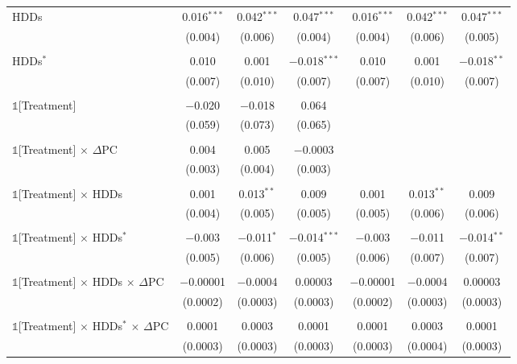 \begin{ThreePartTable}
\begin{longtable}{@{\extracolsep{0pt}}lcccccc}
            HDDs & 0.016$^{***}$ & 0.042$^{***}$ & 0.047$^{***}$ & 0.016$^{***}$ & 0.042$^{***}$ & 0.047$^{***}$ \\ 
            & (0.004) & (0.006) & (0.004) & (0.004) & (0.006) & (0.005) \\ 
            & & & & & & \\ 
            HDDs$^{*}$ & 0.010 & 0.001 & $-$0.018$^{***}$ & 0.010 & 0.001 & $-$0.018$^{**}$ \\ 
            & (0.007) & (0.010) & (0.007) & (0.007) & (0.010) & (0.007) \\ 
            & & & & & & \\ 
            $\mathbb{1}$[Treatment] & $-$0.020 & $-$0.018 & 0.064 &  &  &  \\ 
            & (0.059) & (0.073) & (0.065) &  &  &  \\ 
            & & & & & & \\ 
            $\mathbb{1}$[Treatment] $\times$ $\Delta$PC & 0.004 & 0.005 & $-$0.0003 &  &  &  \\ 
            & (0.003) & (0.004) & (0.003) &  &  &  \\ 
            & & & & & & \\ 
            $\mathbb{1}$[Treatment] $\times$ HDDs & 0.001 & 0.013$^{**}$ & 0.009 & 0.001 & 0.013$^{**}$ & 0.009 \\ 
            & (0.004) & (0.005) & (0.005) & (0.005) & (0.006) & (0.006) \\ 
            & & & & & & \\ 
            $\mathbb{1}$[Treatment] $\times$ HDDs$^{*}$ & $-$0.003 & $-$0.011$^{*}$ & $-$0.014$^{***}$ & $-$0.003 & $-$0.011 & $-$0.014$^{**}$ \\ 
            & (0.005) & (0.006) & (0.005) & (0.006) & (0.007) & (0.007) \\ 
            & & & & & & \\ 
            $\mathbb{1}$[Treatment] $\times$ HDDs $\times$ $\Delta$PC & $-$0.00001 & $-$0.0004 & 0.00003 & $-$0.00001 & $-$0.0004 & 0.00003 \\ 
            & (0.0002) & (0.0003) & (0.0003) & (0.0002) & (0.0003) & (0.0003) \\ 
            & & & & & & \\ 
            $\mathbb{1}$[Treatment] $\times$ HDDs$^{*}$ $\times$ $\Delta$PC & 0.0001 & 0.0003 & 0.0001 & 0.0001 & 0.0003 & 0.0001 \\ 
            & (0.0003) & (0.0003) & (0.0003) & (0.0003) & (0.0004) & (0.0003) \\ 

\end{longtable}
\end{ThreePartTable}
